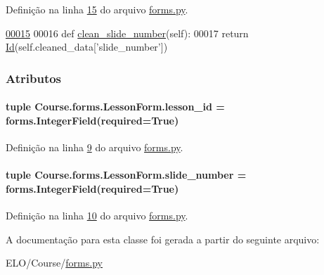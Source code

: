 Definição na linha \hyperlink{Course_2forms_8py_source_l00015}{15} do arquivo \hyperlink{Course_2forms_8py_source}{forms.\-py}.


\begin{DoxyCode}
\hypertarget{classCourse_1_1forms_1_1LessonForm_l00015}{}\hyperlink{classCourse_1_1forms_1_1LessonForm_acc15a807e96d131c1c839ee28da158de}{00015} 
00016     \textcolor{keyword}{def }\hyperlink{classCourse_1_1forms_1_1LessonForm_acc15a807e96d131c1c839ee28da158de}{clean\_slide\_number}(self):
00017         \textcolor{keywordflow}{return} \hyperlink{classELO_1_1BaseUnit_1_1Id}{Id}(self.cleaned\_data[\textcolor{stringliteral}{'slide\_number'}])
\end{DoxyCode}


\subsubsection{Atributos}
\hypertarget{classCourse_1_1forms_1_1LessonForm_a0ed8ca8dc81ac7498c83df4a5735ce04}{
\paragraph[{lesson\-\_\-id}]{\setlength{\rightskip}{0pt plus 5cm}tuple Course.\-forms.\-Lesson\-Form.\-lesson\-\_\-id = forms.\-Integer\-Field(required=True)\hspace{0.3cm}{\ttfamily [static]}}}\label{classCourse_1_1forms_1_1LessonForm_a0ed8ca8dc81ac7498c83df4a5735ce04}


Definição na linha \hyperlink{Course_2forms_8py_source_l00009}{9} do arquivo \hyperlink{Course_2forms_8py_source}{forms.\-py}.

\hypertarget{classCourse_1_1forms_1_1LessonForm_ad030e96bd25bff769cce537955b318d1}{
\paragraph[{slide\-\_\-number}]{\setlength{\rightskip}{0pt plus 5cm}tuple Course.\-forms.\-Lesson\-Form.\-slide\-\_\-number = forms.\-Integer\-Field(required=True)\hspace{0.3cm}{\ttfamily [static]}}}\label{classCourse_1_1forms_1_1LessonForm_ad030e96bd25bff769cce537955b318d1}


Definição na linha \hyperlink{Course_2forms_8py_source_l00010}{10} do arquivo \hyperlink{Course_2forms_8py_source}{forms.\-py}.



A documentação para esta classe foi gerada a partir do seguinte arquivo\-:\begin{DoxyCompactItemize}
\item 
E\-L\-O/\-Course/\hyperlink{Course_2forms_8py}{forms.\-py}\end{DoxyCompactItemize}
